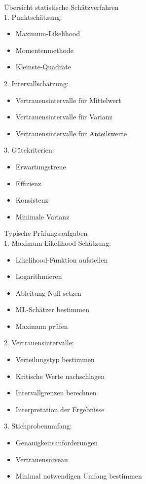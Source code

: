 \begin{concept}{Übersicht statistische Schätzverfahren}\\
1. Punktschätzung:
   \begin{itemize}
     \item Maximum-Likelihood
     \item Momentenmethode
     \item Kleinste-Quadrate
   \end{itemize}

2. Intervallschätzung:
   \begin{itemize}
     \item Vertrauensintervalle für Mittelwert
     \item Vertrauensintervalle für Varianz
     \item Vertrauensintervalle für Anteilswerte
   \end{itemize}

3. Gütekriterien:
   \begin{itemize}
     \item Erwartungstreue
     \item Effizienz
     \item Konsistenz
     \item Minimale Varianz
   \end{itemize}
\end{concept}

\begin{KR}{Typische Prüfungsaufgaben}\\
1. Maximum-Likelihood-Schätzung:
   \begin{itemize}
     \item Likelihood-Funktion aufstellen
     \item Logarithmieren
     \item Ableitung Null setzen
     \item ML-Schätzer bestimmen
     \item Maximum prüfen
   \end{itemize}

2. Vertrauensintervalle:
   \begin{itemize}
     \item Verteilungstyp bestimmen
     \item Kritische Werte nachschlagen
     \item Intervallgrenzen berechnen
     \item Interpretation der Ergebnisse
   \end{itemize}

3. Stichprobenumfang:
   \begin{itemize}
     \item Genauigkeitsanforderungen
     \item Vertrauensniveau
     \item Minimal notwendigen Umfang bestimmen
   \end{itemize}
\end{KR}